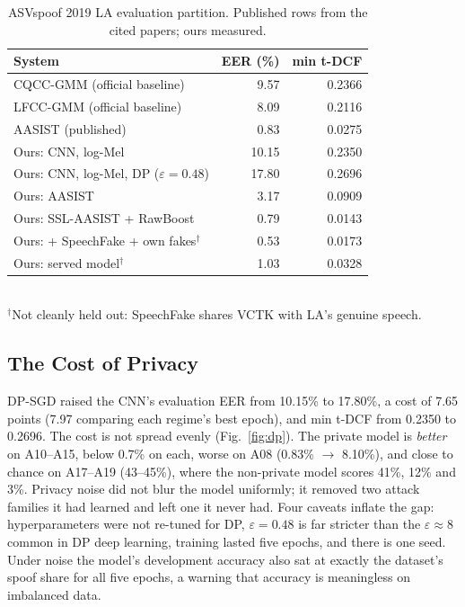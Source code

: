 \documentclass[journal]{IEEEtran}
\begin{document}
\begin{table}[!t]
\caption{ASVspoof 2019 LA evaluation partition. Published rows from the
cited papers; ours measured.}
\label{tab:la}
\centering
\footnotesize
\begin{tabular}{@{}lrr@{}}
\toprule
System & EER (\%) & min t-DCF \\
\midrule
CQCC-GMM (official baseline) & 9.57 & 0.2366 \\
LFCC-GMM (official baseline) & 8.09 & 0.2116 \\
AASIST (published)~\cite{jung2022aasist} & 0.83 & 0.0275 \\
\midrule
Ours: CNN, log-Mel & 10.15 & 0.2350 \\
Ours: CNN, log-Mel, DP ($\varepsilon = 0.48$) & 17.80 & 0.2696 \\
Ours: AASIST & 3.17 & 0.0909 \\
Ours: SSL-AASIST + RawBoost & 0.79 & 0.0143 \\
Ours: + SpeechFake + own fakes$^\dagger$ & 0.53 & 0.0173 \\
Ours: served model$^\dagger$ & 1.03 & 0.0328 \\
\bottomrule
\end{tabular}\\[2pt]
{\scriptsize $^\dagger$Not cleanly held out: SpeechFake shares VCTK with
LA's genuine speech.}
\end{table}

\subsection{The Cost of Privacy}
DP-SGD raised the CNN's evaluation EER from 10.15\% to 17.80\%, a cost of
7.65 points (7.97 comparing each regime's best epoch), and min t-DCF from
0.2350 to 0.2696. The cost is not spread evenly (Fig.~\ref{fig:dp}). The
private model is \emph{better} on A10--A15, below 0.7\% on each, worse on
A08 (0.83\% $\to$ 8.10\%), and close to chance on A17--A19 (43--45\%), where
the non-private model scores 41\%, 12\% and 3\%. Privacy noise did not blur the model uniformly; it removed two
attack families it had learned and left one it never had. Four caveats inflate
the gap: hyperparameters were not re-tuned for DP, $\varepsilon = 0.48$ is
far stricter than the $\varepsilon \approx 8$ common in DP deep learning,
training lasted five epochs, and there is one seed. Under noise the model's
development accuracy also sat at exactly the dataset's spoof share for all
five epochs, a warning that accuracy is meaningless on imbalanced data.
\end{document}
